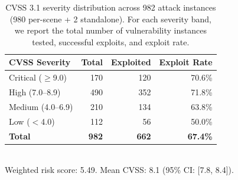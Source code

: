 \begin{table}[t]
\centering
\caption{CVSS 3.1 severity distribution across 982 attack instances (980 per-scene + 2 standalone).
For each severity band, we report the total number of vulnerability instances tested, successful exploits, and exploit rate.}
\label{tab:cvss-distribution}
\small
\begin{tabular}{l r r r}
\toprule
\textbf{CVSS Severity} & \textbf{Total} & \textbf{Exploited} & \textbf{Exploit Rate} \\
\midrule
Critical ($\geq$9.0)  & 170 & 120 & 70.6\% \\
High (7.0--8.9)       & 490 & 352 & 71.8\% \\
Medium (4.0--6.9)     & 210 & 134 & 63.8\% \\
Low ($<$4.0)          & 112 &  56 & 50.0\% \\
\midrule
\textbf{Total} & \textbf{982} & \textbf{662} & \textbf{67.4\%} \\
\bottomrule
\end{tabular}
\\[2pt]
\footnotesize Weighted risk score: 5.49. Mean CVSS: 8.1 (95\% CI: [7.8, 8.4]).
\end{table}